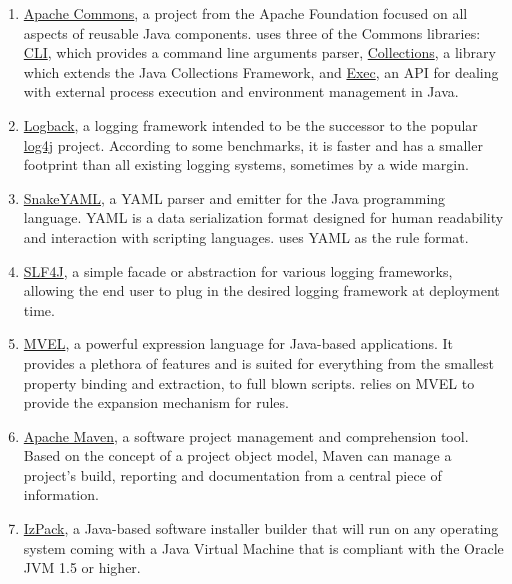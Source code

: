 \documentclass[a4paper,twoside,12pt]{memoir}
\begin{document}
\begin{enumerate}
\item \href{http://commons.apache.org}{Apache Commons}, a project from the Apache Foundation focused on all aspects of reusable Java components. \arara uses three of the Commons libraries: \href{http://commons.apache.org/cli/}{CLI}, which provides a command line arguments parser, \href{http://commons.apache.org/collections/}{Collections}, a library which  	extends the Java Collections Framework, and \href{http://commons.apache.org/exec/}{Exec}, an API for dealing with external process execution and environment management in Java.

\item \href{http://logback.qos.ch}{Logback}, a logging framework intended to be the successor to the popular \href{http://logging.apache.org/log4j/}{log4j} project. According to some benchmarks, it is faster and has a smaller footprint than all existing logging systems, sometimes by a wide margin.

\item \href{http://code.google.com/p/snakeyaml}{SnakeYAML}, a YAML parser and emitter for the Java programming language. YAML is a data serialization format designed for human readability and interaction with scripting languages. \arara uses YAML as the rule format.

\item \href{http://www.slf4j.org/}{SLF4J}, a simple facade or abstraction for various logging frameworks, allowing the end user to plug in the desired logging framework at deployment time.

\item \href{http://mvel.codehaus.org}{MVEL}, a powerful expression language for Java-based applications. It provides a plethora of features and is suited for everything from the smallest property binding and extraction, to full blown scripts. \arara relies on MVEL to provide the expansion mechanism for rules.

\item \href{http://maven.apache.org/}{Apache Maven}, a software project management and comprehension tool. Based on the concept of a project object model, Maven can manage a project's build, reporting and documentation from a central piece of information. 

\item \href{http://izpack.github.com}{IzPack}, a Java-based software installer builder that will run on any operating system coming with a Java Virtual Machine that is compliant with the Oracle JVM 1.5 or higher.
\end{enumerate}
\end{document}
